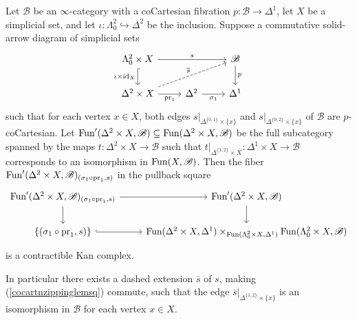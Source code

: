 \documentclass{tac}
\newcommand{\s}[1]{\mathscr{#1}}
\newcommand{\ol}[1]{\overline{#1}}
\newcommand{\tx}[1]{\textnormal{#1}}
\begin{document}
\begin{lemma}\label{cocartnzippinglem} Let $\s{B}$ be an $\infty$-category with a coCartesian fibration $p: \s{B}\to \Delta^1$, let $X$ be a simplicial set, and let $\iota : \Lambda^2_0 \hookrightarrow \Delta^2$ be the inclusion.  Suppose a commutative solid-arrow diagram of simplicial sets
\begin{equation}\label{cocartnzippinglemsq}\begin{tikzcd}
\Lambda^2_0 \times X \arrow[hook]{d}[swap]{\iota \times \tx{id}_X} \arrow[]{rr}{s} & & \s{B} \arrow[]{d}{p} \\
\Delta^2 \times X \arrow[]{r}[swap]{\tx{pr}_1} \arrow[dashed]{urr}{\ol{s}} & \Delta^2 \arrow[]{r}[swap]{\sigma_1} & \Delta^1
\end{tikzcd}\end{equation}
such that for each vertex $x \in X$, both edges $s |_{\Delta^{\{ 0,1\}} \times \{x\}}$ and $s |_{\Delta^{\{0,2 \}} \times \{x\}}$ of $\s{B}$ are $p$-coCartesian.  Let $\tx{Fun}'(\Delta^2 \times X , \s{B}) \subseteq \tx{Fun}(\Delta^2 \times X , \s{B})$ be the full subcategory spanned by the maps $t : \Delta^2 \times X \to \s{B}$ such that $t |_{\Delta^{\{1,2 \}} \times X} : \Delta^1 \times X \to \s{B}$ corresponds to an isomorphism in $\tx{Fun}(X,\s{B})$.  Then the fiber $\tx{Fun}' (\Delta^2 \times X,\s{B})_{(\sigma_1 \circ \tx{pr}_1 , s)} $ in the pullback square
\[\begin{tikzcd}
\tx{Fun}' (\Delta^2 \times X,\s{B})_{(\sigma_1 \circ \tx{pr}_1 , s)} \arrow[]{d} \arrow[]{r}& \tx{Fun}' (\Delta^2 \times X,\s{B}) \arrow[]{d} \\
\{ (\sigma_1 \circ \tx{pr}_1 , s) \} \arrow[hook]{r}& \tx{Fun}(\Delta^2 \times X , \Delta^1) \times_{\tx{Fun}(\Lambda^2_0 \times X , \Delta^1)} \tx{Fun}(\Lambda^2_0 \times X, \s{B})
\end{tikzcd}\]
is a contractible Kan complex.

In particular there exists a dashed extension $\ol{s}$ of $s$, making (\ref{cocartnzippinglemsq}) commute, such that the edge $\ol{s}|_{\Delta^{\{1,2 \}} \times \{ x\} }$  is an isomorphism in $\s{B}$ for each vertex $x\in X$.
\end{lemma}
\end{document}
